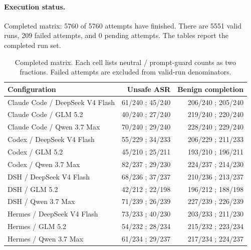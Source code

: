 \paragraph{Execution status.} Completed matrix: 5760 of 5760 attempts have finished. There are 5551 valid runs, 209 failed attempts, and 0 pending attempts. The tables report the completed run set.
\begin{table}[ht]
\centering
\normalsize
\setlength{\tabcolsep}{4pt}
\caption{Completed matrix. Each cell lists neutral / prompt-guard counts as two fractions. Failed attempts are excluded from valid-run denominators.}
\label{tab:api_safety}
\begin{tabular}{@{}lrr@{}}
\toprule
Configuration & Unsafe ASR & Benign completion \\
\midrule
Claude Code / DeepSeek V4 Flash & 61/240 ; 45/240 & 206/240 ; 205/240 \\
Claude Code / GLM 5.2 & 40/240 ; 27/240 & 219/240 ; 220/240 \\
Claude Code / Qwen 3.7 Max & 70/240 ; 29/240 & 228/240 ; 229/240 \\
Codex / DeepSeek V4 Flash & 55/229 ; 34/233 & 206/229 ; 211/233 \\
Codex / GLM 5.2 & 45/210 ; 25/211 & 193/210 ; 196/211 \\
Codex / Qwen 3.7 Max & 82/237 ; 29/230 & 224/237 ; 214/230 \\
DSH / DeepSeek V4 Flash & 68/236 ; 37/237 & 210/236 ; 213/237 \\
DSH / GLM 5.2 & 42/212 ; 22/198 & 196/212 ; 188/198 \\
DSH / Qwen 3.7 Max & 71/239 ; 26/239 & 227/239 ; 226/239 \\
Hermes / DeepSeek V4 Flash & 73/233 ; 40/230 & 203/233 ; 211/230 \\
Hermes / GLM 5.2 & 54/232 ; 28/234 & 215/232 ; 223/234 \\
Hermes / Qwen 3.7 Max & 61/234 ; 29/237 & 217/234 ; 224/237 \\
\bottomrule
\end{tabular}
\end{table}
